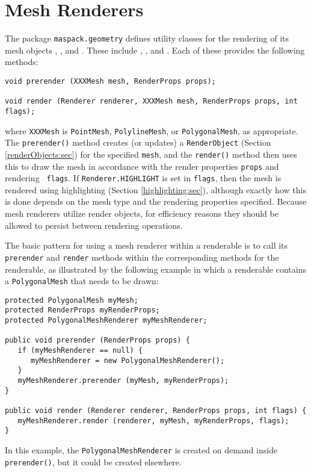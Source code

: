 \section{Mesh Renderers}
\label{meshRendering:sec}

The package {\tt maspack.geometry} defines utility classes for the
rendering of its mesh objects
,
, and
.
These include
,
, and
.
Each of these provides the following methods:
%
\begin{lstlisting}[]
void prerender (XXXMesh mesh, RenderProps props);

void render (Renderer renderer, XXXMesh mesh, RenderProps props, int flags);
\end{lstlisting}
%
where {\tt XXXMesh} is {\tt PointMesh}, {\tt PolylineMesh}, or 
{\tt PolygonalMesh}, as appropriate.
The {\tt prerender()} method creates (or updates) a {\tt RenderObject}
(Section \ref{renderObjects:sec}) for the specified {\tt mesh}, and
the {\tt render()} method then uses this to draw the mesh in
accordance with the render properties {\tt props} and rendering {\tt
flags}.  If {\tt Renderer.HIGHLIGHT} is set in {\tt flags}, then the
mesh is rendered using highlighting (Section \ref{highlighting:sec}),
although exactly how this is done depends on the mesh type and the
rendering properties specified.  Because mesh renderers utilize
render objects, for efficiency reasons they should be allowed to
persist between rendering operations.

The basic pattern for using a mesh renderer within a renderable is to
call its {\tt prerender} and {\tt render} methods within the
corresponding methods for the renderable, as illustrated by the
following example in which a renderable contains a {\tt PolygonalMesh}
that needs to be drawn:
%
\begin{lstlisting}[]
protected PolygonalMesh myMesh;
protected RenderProps myRenderProps;
protected PolygonalMeshRenderer myMeshRenderer;

public void prerender (RenderProps props) {
   if (myMeshRenderer == null) {
      myMeshRenderer = new PolygonalMeshRenderer();
   }
   myMeshRenderer.prerender (myMesh, myRenderProps);
}

public void render (Renderer renderer, RenderProps props, int flags) {
   myMeshRenderer.render (renderer, myMesh, myRenderProps, flags);
}
\end{lstlisting}
%
In this example, the {\tt PolygonalMeshRenderer} is created on demand
inside {\tt prerender()}, but it could be created elsewhere.

